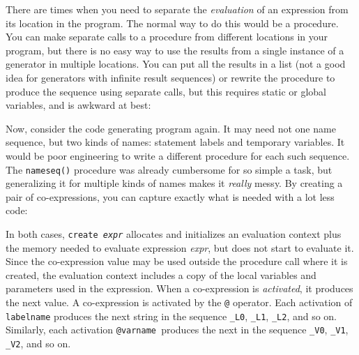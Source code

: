 There are times when you need to separate the {\em evaluation\/} of an
expression from its location in the program. The normal
way to do this would be a procedure. You can make separate calls
to a procedure from different locations in your program, but there is
no easy way to use the results from a single instance
of a generator in multiple locations. You can put all the results in a
list (not a good idea for generators with infinite result sequences) or
rewrite the procedure to produce the sequence using separate calls, but
this requires static or global variables, and is awkward at best:


Now, consider the code generating program again. It may need not one
name sequence, but two kinds of names: statement labels and
temporary variables. It would be poor engineering to write a different
procedure for each such sequence. The \texttt{nameseq()}
procedure was already cumbersome for so simple a task, but generalizing
it for multiple kinds of names makes it \textit{really} messy. By
creating a pair of co-expressions, you can capture exactly what is
needed with a lot less code:


\noindent
In both cases, \texttt{create}\texttt{
}\texttt{\textit{expr}} allocates and initializes an evaluation context
plus the memory needed to evaluate expression \textit{expr}, but does
not start to evaluate it. Since the co-expression value may be used
outside the procedure call where it is created, the evaluation context
includes a copy of the local variables and parameters used in the
expression. When a co-expression is \textit{activated}, it produces the
next value. A co-expression is activated by the \texttt{@} operator. Each
activation of \texttt{labelname} produces the next string in the
sequence \texttt{{\textquotedbl}\_L0{\textquotedbl}},
\texttt{{\textquotedbl}\_L1{\textquotedbl}},
\texttt{{\textquotedbl}\_L2{\textquotedbl}}, and so on. Similarly, each
activation \texttt{@varname}\texttt{ }produces the next in the sequence
\texttt{{\textquotedbl}\_V0{\textquotedbl}},
\texttt{{\textquotedbl}\_V1{\textquotedbl}},
\texttt{{\textquotedbl}\_V2{\textquotedbl}}, and so on. 

